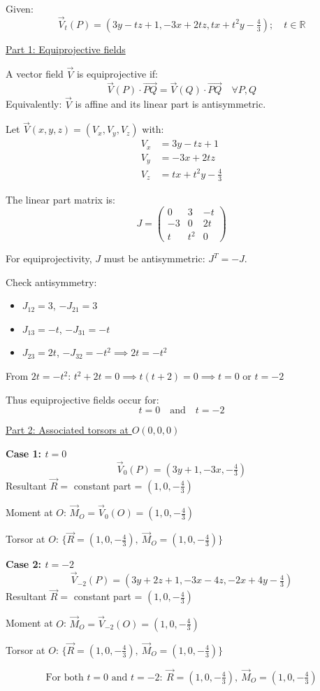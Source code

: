 \documentclass[12pt]{article}
\begin{document}
\begin{correctionbox}
Given:
\[
\vec{V}_t(P) = (3y - tz + 1, -3x + 2tz, tx + t^2y - \tfrac{4}{3}); \quad t \in \mathbb{R}
\]

\underline{Part 1: Equiprojective fields}

A vector field $\vec{V}$ is equiprojective if:
\[
\vec{V}(P) \cdot \vec{PQ} = \vec{V}(Q) \cdot \vec{PQ} \quad \forall P,Q
\]
Equivalently: $\vec{V}$ is affine and its linear part is antisymmetric.

Let $\vec{V}(x,y,z) = (V_x, V_y, V_z)$ with:
\begin{align*}
V_x &= 3y - tz + 1 \\
V_y &= -3x + 2tz \\
V_z &= tx + t^2y - \tfrac{4}{3}
\end{align*}

The linear part matrix is:
\[
J = \begin{pmatrix}
0 & 3 & -t \\
-3 & 0 & 2t \\
t & t^2 & 0
\end{pmatrix}
\]

For equiprojectivity, $J$ must be antisymmetric: $J^T = -J$.

Check antisymmetry:
\begin{itemize}
\item $J_{12} = 3$, $-J_{21} = 3$ 
\item $J_{13} = -t$, $-J_{31} = -t$ 
\item $J_{23} = 2t$, $-J_{32} = -t^2 \implies 2t = -t^2$
\end{itemize}

From $2t = -t^2$: $t^2 + 2t = 0 \implies t(t + 2) = 0 \implies t = 0$ or $t = -2$

Thus equiprojective fields occur for:
\[
\boxed{t = 0 \quad \text{and} \quad t = -2}
\]

\underline{Part 2: Associated torsors at $O(0,0,0)$}

\textbf{Case 1: $t = 0$}
\[
\vec{V}_0(P) = (3y + 1, -3x, -\tfrac{4}{3})
\]
Resultant $\vec{R} =$ constant part = $(1, 0, -\tfrac{4}{3})$

Moment at $O$: $\vec{M}_O = \vec{V}_0(O) = (1, 0, -\tfrac{4}{3})$

Torsor at $O$: $\{\vec{R} = (1, 0, -\tfrac{4}{3}), \ \vec{M}_O = (1, 0, -\tfrac{4}{3})\}$

\textbf{Case 2: $t = -2$}
\[
\vec{V}_{-2}(P) = (3y + 2z + 1, -3x - 4z, -2x + 4y - \tfrac{4}{3})
\]
Resultant $\vec{R} =$ constant part = $(1, 0, -\tfrac{4}{3})$

Moment at $O$: $\vec{M}_O = \vec{V}_{-2}(O) = (1, 0, -\tfrac{4}{3})$

Torsor at $O$: $\{\vec{R} = (1, 0, -\tfrac{4}{3}), \ \vec{M}_O = (1, 0, -\tfrac{4}{3})\}$

\[
\boxed{\text{For both } t=0 \text{ and } t=-2: \ \vec{R} = (1,0,-\tfrac{4}{3}), \ \vec{M}_O = (1,0,-\tfrac{4}{3})}
\]
\end{correctionbox}
\end{document}
